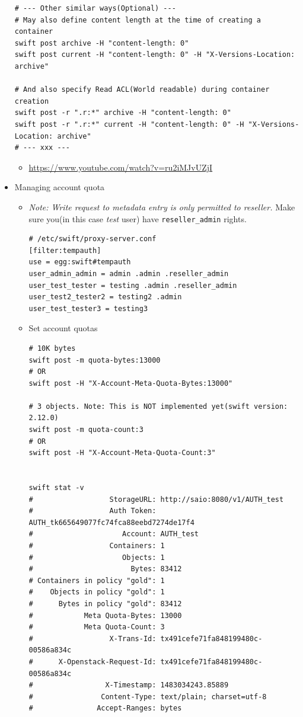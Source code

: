 \documentclass{article}
\begin{document}
\begin{itemize}
\begin{verbatim}
# --- Other similar ways(Optional) ---
# May also define content length at the time of creating a container
swift post archive -H "content-length: 0"
swift post current -H "content-length: 0" -H "X-Versions-Location: archive"

# And also specify Read ACL(World readable) during container creation
swift post -r ".r:*" archive -H "content-length: 0"
swift post -r ".r:*" current -H "content-length: 0" -H "X-Versions-Location: archive"
# --- xxx ---
\end{verbatim}

\begin{itemize}
\item \url{https://www.youtube.com/watch?v=ru2iMJvUZjI}
\end{itemize}

\item Managing account quota

\begin{itemize}
\item \emph{Note: Write request to metadata entry is only permitted to
reseller.} Make sure you(in this case \emph{test} user) have
\texttt{reseller\_admin} rights.

\begin{verbatim}
# /etc/swift/proxy-server.conf
[filter:tempauth]
use = egg:swift#tempauth
user_admin_admin = admin .admin .reseller_admin
user_test_tester = testing .admin .reseller_admin
user_test2_tester2 = testing2 .admin
user_test_tester3 = testing3
\end{verbatim}

\item Set account quotas

\begin{verbatim}
# 10K bytes
swift post -m quota-bytes:13000
# OR
swift post -H "X-Account-Meta-Quota-Bytes:13000"

# 3 objects. Note: This is NOT implemented yet(swift version: 2.12.0)
swift post -m quota-count:3
# OR
swift post -H "X-Account-Meta-Quota-Count:3"


swift stat -v
#                  StorageURL: http://saio:8080/v1/AUTH_test
#                  Auth Token: AUTH_tk665649077fc74fca88eebd7274de17f4
#                     Account: AUTH_test
#                  Containers: 1
#                     Objects: 1
#                       Bytes: 83412
# Containers in policy "gold": 1
#    Objects in policy "gold": 1
#      Bytes in policy "gold": 83412
#            Meta Quota-Bytes: 13000
#            Meta Quota-Count: 3
#                  X-Trans-Id: tx491cefe71fa848199480c-00586a834c
#      X-Openstack-Request-Id: tx491cefe71fa848199480c-00586a834c
#                 X-Timestamp: 1483034243.85889
#                Content-Type: text/plain; charset=utf-8
#               Accept-Ranges: bytes



\end{verbatim}
\end{itemize}
\end{itemize}
\end{document}
